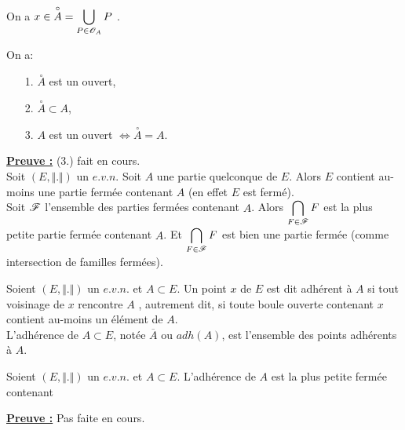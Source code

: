 \documentclass[class=report,crop=false]{standalone}
\begin{document}
 \begin{remarque*}
\textcolor[rgb]{0.00,0.00,1.00}{
\noindent On a $x\in \overset{\circ}{A}=\displaystyle \bigcup_{P \in \mathscr{O}_A} P$ .
}
\end{remarque*}

\begin{remarque*}
\textcolor[rgb]{0.00,0.00,1.00}{
\noindent On a:
\begin{itemize}
\item[1.] $\overset{\circ}{A}$ est un ouvert,
\item[2.] $\overset{\circ}{A} \subset A$,
\item[3.] $A$ est un ouvert $\Longleftrightarrow \overset{\circ}{A}=A$.
\end{itemize}
}
\end{remarque*}


\noindent \underline{\bf Preuve :}
(3.) fait en cours.\\
$ $ \\



\noindent Soit $(E,\Vert . \Vert)$ un $e.v.n$. Soit $A $ une partie quelconque de $E$. Alors $E$ contient au-moins
une partie fermée contenant $A$ (en effet $E$ est fermé). \\
Soit $\mathscr{F}$ l'ensemble des parties fermées contenant $A$. Alors $ \displaystyle \bigcap_{F \in \mathscr{F}} F$ est la
plus petite partie fermée contenant $A$. Et $ \displaystyle \bigcap_{F \in \mathscr{F}} F$ est bien 
une partie fermée (comme intersection de familles fermées).

\begin{definition}[ADHERENCE]
\textcolor[rgb]{0.73,0.00,0.00}{
\noindent Soient $(E,\Vert . \Vert)$  un $e.v.n.$ et $A \subset E$. Un point $x$ de $E$ est dit adhérent à $A$ si tout voisinage de $x$ rencontre $A$ , autrement dit, si toute boule ouverte contenant $x$ contient au-moins un élément de $A$.\\
L'adhérence de $A \subset E$, notée $\overline{A}$ ou $adh(A)$,  est l'ensemble des points adhérents à $A$. 
}
\end{definition}

\begin{proposition}
\textcolor[rgb]{0.50,0.00,0.25}{\vspace{0.1cm}
Soient $(E,\Vert . \Vert)$  un $e.v.n.$ et $A \subset E$. L'adhérence de $A$  est la plus petite fermée contenant
}
\end{proposition}
\noindent \underline{\bf Preuve :}
Pas faite en cours.
\end{document}
